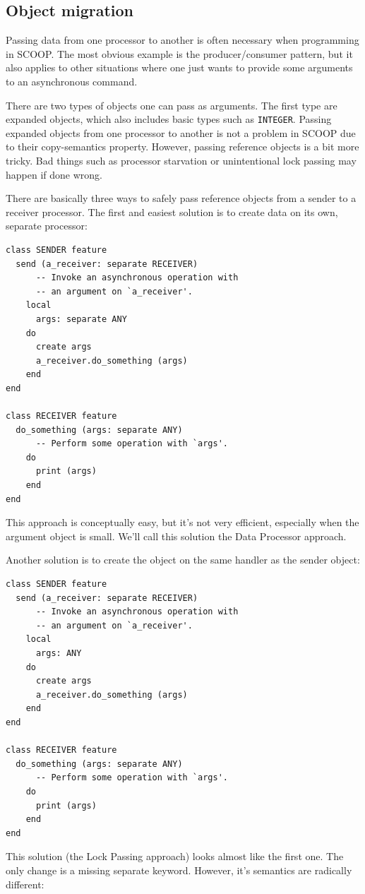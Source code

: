 \documentclass[a4paper,10pt]{article}
\begin{document}
\subsection{Object migration}
\label{sec:object-migration}

Passing data from one processor to another is often necessary when programming in SCOOP.
The most obvious example is the producer/consumer pattern, but it also applies to other situations where one just wants to provide some arguments to an asynchronous command.

There are two types of objects one can pass as arguments.
The first type are expanded objects, which also includes basic types such as \lstinline!INTEGER!.
Passing expanded objects from one processor to another is not a problem in SCOOP due to their copy-semantics property.
However, passing reference objects is a bit more tricky.
Bad things such as processor starvation or unintentional lock passing may happen if done wrong.

There are basically three ways to safely pass reference objects from a sender to a receiver processor.
The first and easiest solution is to create data on its own, separate processor: 
\begin{lstlisting}[language=OOSC2Eiffel, captionpos=b, caption={Migrate objects on a separate processor.}]
class SENDER feature
  send (a_receiver: separate RECEIVER)
      -- Invoke an asynchronous operation with
      -- an argument on `a_receiver'.
    local
      args: separate ANY
    do
      create args
      a_receiver.do_something (args)
    end
end

class RECEIVER feature 
  do_something (args: separate ANY)
      -- Perform some operation with `args'.
    do
      print (args)
    end
end
\end{lstlisting}
This approach is conceptually easy, but it's not very efficient, especially when the argument object is small.
We'll call this solution the Data Processor approach.

Another solution is to create the object on the same handler as the sender object:
\begin{lstlisting}[language=OOSC2Eiffel, captionpos=b, caption={Migrate objects with lock passing.}]
class SENDER feature
  send (a_receiver: separate RECEIVER)
      -- Invoke an asynchronous operation with
      -- an argument on `a_receiver'.
    local
      args: ANY
    do
      create args
      a_receiver.do_something (args)
    end
end

class RECEIVER feature 
  do_something (args: separate ANY)
      -- Perform some operation with `args'.
    do
      print (args)
    end
end
\end{lstlisting}
This solution (the Lock Passing approach) looks almost like the first one.
The only change is a missing separate keyword.
However, it's semantics are radically different:
\end{document}
